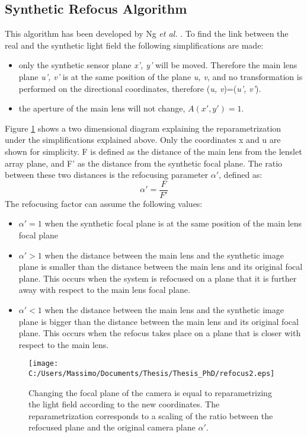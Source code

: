 \subsection{Synthetic Refocus Algorithm}
 This algorithm has been developed by Ng \textit{et al.} \cite{ng2005light}. To find the link between the real and the synthetic light field the following simplifications are made: 
 \begin{itemize}
 	\item only the synthetic sensor plane \textit{x', y'} will be moved. Therefore the main lens plane \textit{u', v'} is at the same position of the plane \textit{u, v}, and no transformation is performed on the directional coordinates, therefore (\textit{u, v})=(\textit{u', v'}).
 	\item the aperture of the main lens will not change, $A(x', y')=1$.
 \end{itemize} 
 Figure \ref{fig:synthetic3} shows a two dimensional diagram explaining the reparametrization under the simplifications explained above. Only the coordinates x and u are shown for simplicity. F is defined as the distance of the main lens from the lenslet array plane, and F' as the distance from the synthetic focal plane. The ratio between these two distances is the refocusing parameter $ \alpha'$, defined as: 
 \begin{equation}
 	\label{eq:alpha}
 	 \alpha' = \dfrac{F}{F'}
 \end{equation}
 The refocusing factor can assume the following values:
 \begin{itemize}
 	\item $ \alpha'=1$ when the synthetic focal plane is at the same position of the main lens focal plane
 	\item $ \alpha'>1$ when the distance between the main lens and the synthetic 
 	image plane is smaller than the distance between the main lens and its original focal plane. This occurs when the system is refocused on a plane that it is further away with respect to the main lens focal plane.
 	\item $ \alpha'<1$ when the distance between the main lens and the synthetic image plane is bigger than the distance between the main lens and its original focal plane. This occurs when the refocus takes place on a plane that is closer with respect to the main lens.
 \end{itemize}
 \begin{figure}[H]
 	\centering
 	\texttt{[image: C:/Users/Massimo/Documents/Thesis/Thesis\_PhD/refocus2.eps]}
 	\caption{\label{fig:synthetic3} Changing the focal plane of the camera is equal to reparametrizing the light field according to the new coordinates. The reparametrization corresponds to a scaling of the ratio between the refocused plane and the original camera plane $ \alpha'$. }
 \end{figure}
